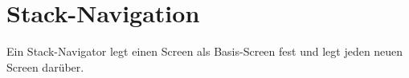 \section{Stack-Navigation}
Ein Stack-Navigator legt einen Screen als Basis-Screen fest und legt jeden neuen Screen darüber.

